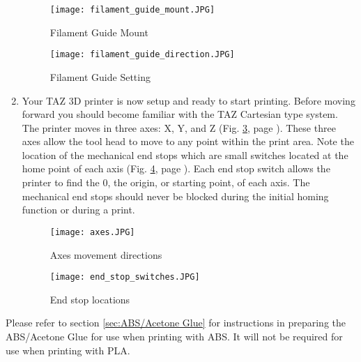 \begin{enumerate}
\begin{figure}[H]
\centering
\texttt{[image: filament\_guide\_mount.JPG]}
\caption{Filament Guide Mount}
\label{fig:filament_guide_mount}
\end{figure}

\begin{figure}[H]
\centering
\texttt{[image: filament\_guide\_direction.JPG]}
\caption{Filament Guide Setting}
\label{fig:filament_guide_setting}
\end{figure}

\item Your TAZ 3D printer is now setup and ready to start printing. Before moving forward you should become familiar with the TAZ Cartesian type system. The printer moves in three axes: X, Y, and Z (Fig. \ref{fig:axes}, page \pageref{fig:axes}). These three axes allow the tool head to move to any point within the print area. Note the location of the mechanical end stops which are small switches located at the home point of each axis (Fig. \ref{fig:endstops}, page \pageref{fig:endstops}). Each end stop switch allows the printer to find the 0, the origin, or starting point, of each axis. The mechanical end stops should never be blocked during the initial homing function or during a print.
\begin{figure}[H]
\centering
\texttt{[image: axes.JPG]}
\caption{Axes movement directions}
\label{fig:axes}
\end{figure}

\begin{figure}[hp]
\centering
\texttt{[image: end\_stop\_switches.JPG]}
\caption{End stop locations}
\label{fig:endstops}
\end{figure}


\end{enumerate}

\item Please refer to section \ref{sec:ABS/Acetone Glue} for instructions in preparing the ABS/Acetone Glue for use when printing with ABS. It will not be required for use when printing with PLA.

